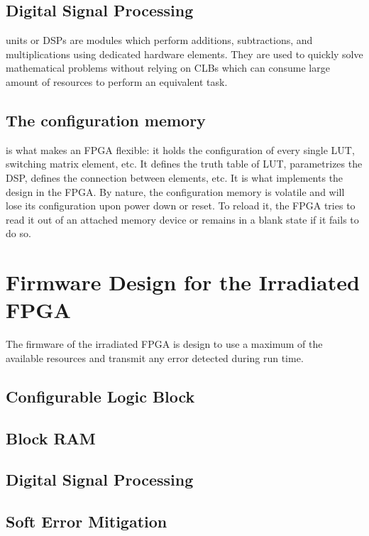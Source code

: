     \subsection{Digital Signal Processing} units or DSPs are modules which perform additions, subtractions, and multiplications using dedicated hardware elements. They are used to quickly solve mathematical problems without relying on CLBs which can consume large amount of resources to perform an equivalent task.

    \subsection{The configuration memory} is what makes an FPGA flexible: it holds the configuration of every single LUT, switching matrix element, etc. It defines the truth table of LUT, parametrizes the DSP, defines the connection between elements, etc. It is what implements the design in the FPGA. By nature, the configuration memory is volatile and will lose its configuration upon power down or reset. To reload it, the FPGA tries to read it out of an attached memory device or remains in a blank state if it fails to do so.

  \section{Firmware Design for the Irradiated FPGA}

    The firmware of the irradiated FPGA is design to use a maximum of the available resources and transmit any error detected during run time.

    \subsection{Configurable Logic Block}

    \subsection{Block RAM}

    \subsection{Digital Signal Processing}

    \subsection{Soft Error Mitigation}

